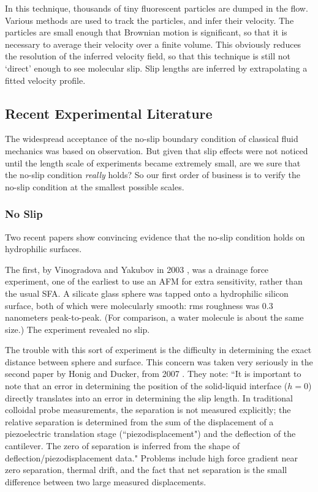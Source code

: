 \documentclass[12pt, a4paper, twoside, openright]{book}
\begin{document}
In this technique, thousands of tiny fluorescent particles are dumped in the flow.  Various methods are used to track the particles, and infer their velocity.  The particles are small enough that Brownian motion is significant, so that it is necessary to average their velocity over a finite volume.  This obviously reduces the resolution of the inferred velocity field, so that this technique is still not `direct' enough to see molecular slip. Slip lengths are inferred by extrapolating a fitted velocity profile.

\subsection{Recent Experimental Literature}

The widespread acceptance of the no-slip boundary condition of classical fluid mechanics was based on observation. But given that slip effects were not noticed until the length scale of experiments became extremely small, are we sure that the no-slip condition \emph{really} holds?  So our first order of business is to verify the no-slip condition at the smallest possible scales.

\subsubsection{No Slip}

Two recent papers show convincing evidence that the no-slip condition holds on hydrophilic surfaces.

The first, by Vinogradova and Yakubov in 2003 \cite{VinogradovaYakubov2003}, was a drainage force experiment, one of the earliest to use an AFM for extra sensitivity, rather than the usual SFA. A silicate glass sphere was tapped onto a hydrophilic silicon surface, both of which were molecularly smooth: rms roughness was 0.3 nanometers peak-to-peak. (For comparison, a water molecule is about the same size.) The experiment revealed no slip.

The trouble with this sort of experiment is the difficulty in determining the exact distance between sphere and surface.  This concern was taken very seriously in the second paper by Honig and Ducker, from 2007 \cite{HonigDucker2007}. They note: ``It is important to note that an error in determining the position of the solid-liquid interface ($h=0$) directly translates into an error in determining the slip length. In traditional colloidal probe measurements, the separation is not measured explicitly; the relative separation is determined from the sum of the displacement of a piezoelectric translation stage (``piezodisplacement") and the deflection of the cantilever. The zero of separation is inferred from the shape of deflection/piezodisplacement data." Problems include high force gradient near zero separation, thermal drift, and the fact that net separation is the small difference between two large measured displacements.
\end{document}
